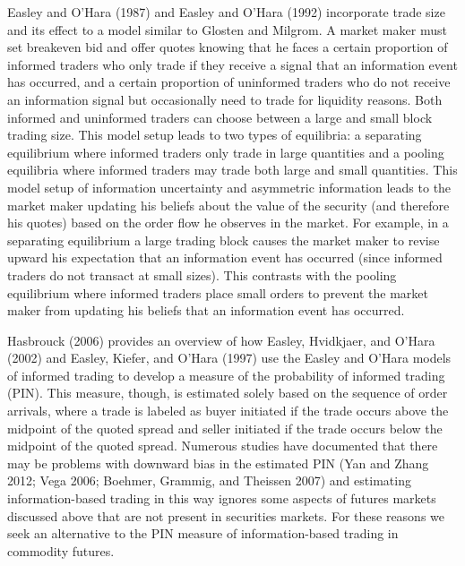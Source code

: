 \documentclass[review,12pt]{elsarticle}
\begin{document}
\begin{linenumbers}
Easley and O'Hara (1987) and Easley and O'Hara (1992) incorporate trade
size and its effect to a model similar to Glosten and Milgrom. A market
maker must set breakeven bid and offer quotes knowing that he faces a
certain proportion of informed traders who only trade if they receive a
signal that an information event has occurred, and a certain proportion
of uninformed traders who do not receive an information signal but
occasionally need to trade for liquidity reasons. Both informed and
uninformed traders can choose between a large and small block trading
size. This model setup leads to two types of equilibria: a separating
equilibrium where informed traders only trade in large quantities and a
pooling equilibria where informed traders may trade both large and small
quantities. This model setup of information uncertainty and asymmetric
information leads to the market maker updating his beliefs about the
value of the security (and therefore his quotes) based on the order flow
he observes in the market. For example, in a separating equilibrium a
large trading block causes the market maker to revise upward his
expectation that an information event has occurred (since informed
traders do not transact at small sizes). This contrasts with the pooling
equilibrium where informed traders place small orders to prevent the
market maker from updating his beliefs that an information event has
occurred.

Hasbrouck (2006) provides an overview of how Easley, Hvidkjaer, and
O'Hara (2002) and Easley, Kiefer, and O'Hara (1997) use the Easley and
O'Hara models of informed trading to develop a measure of the
probability of informed trading (PIN). This measure, though, is
estimated solely based on the sequence of order arrivals, where a trade
is labeled as buyer initiated if the trade occurs above the midpoint of
the quoted spread and seller initiated if the trade occurs below the
midpoint of the quoted spread. Numerous studies have documented that
there may be problems with downward bias in the estimated PIN (Yan and
Zhang 2012; Vega 2006; Boehmer, Grammig, and Theissen 2007) and
estimating information-based trading in this way ignores some aspects of
futures markets discussed above that are not present in securities
markets. For these reasons we seek an alternative to the PIN measure of
information-based trading in commodity futures.


\end{linenumbers}
\end{document}

